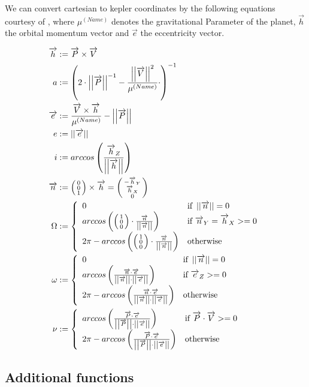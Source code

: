 \documentclass[11pt]{article}
\newcommand{\oa}[1]{\overrightarrow{#1}}
\newcommand{\Pos}{\oa{P}}
\newcommand{\Vel}{\oa{V}}
\newcommand{\absvec}[1]{\left|\left|{#1}\right|\right|}
\newcommand{\dddvec}[3]{\left(\begin{smallmatrix}{#1}\\{#2}\\{#3}\end{smallmatrix}\right)}
\begin{document}
We can convert cartesian to kepler coordinates by the following
equations courtesy of \cite{RSCK}, where $\mu^{(Name)}$ denotes the
gravitational Parameter of the planet, $\oa{h}$ the orbital momentum
vector and $\oa{e}$ the eccentricity vector.

\begin{align}
  \oa{h} &:= \Pos \times \Vel\nonumber\\
  a &:= \left(2\cdot\absvec{\Pos}^{-1} - \frac{\absvec{\Vel}^2}{\mu^{(Name)}}\cdot \right)^{-1}\\
  \oa{e} &:= \frac{\Vel\times \oa{h}}{\mu^{(Name)}} - \absvec{\Pos}\nonumber\\
  e &:= \absvec{\oa{e}}\\
  i &:= arccos\left(\frac{\oa{h}_Z}{\absvec{\oa{h}}} \right)\\
  \oa{n} & := \dddvec{0}{0}{1} \times \oa{h} = \dddvec{-\oa{h}_Y}{\oa{h}_X}{0}\nonumber\\
  \Omega &:= \left\{
    \begin{array}{l l}
      0 & \textrm{if } \absvec{\oa{n}} = 0\\
      arccos\left(\dddvec{1}{0}{0}\cdot\frac{\oa{n}}{\absvec{\oa{n}}} \right) & \textrm{if } \oa{n}_Y = \oa{h}_X >= 0\\
      2\pi - arccos\left(\dddvec{1}{0}{0}\cdot\frac{\oa{n}}{\absvec{\oa{n}}} \right) & \textrm{otherwise}
    \end{array}
    \right.\\
  \omega & := \left\{
    \begin{array}{l l}
      0 & \textrm{if } \absvec{\oa{n}} = 0\\
      arccos\left(\frac{\oa{n}\cdot\oa{e}}{\absvec{\oa{n}}\cdot\absvec{\oa{e}}} \right) & \textrm{if } \oa{e}_Z >= 0\\
      2\pi - arccos\left(\frac{\oa{n}\cdot\oa{e}}{\absvec{\oa{n}}\cdot\absvec{\oa{e}}}\right) & \textrm{otherwise}
    \end{array}
    \right.\\
    \nu &:= \left\{
    \begin{array}{l l}
      arccos\left(\frac{\Pos\cdot\oa{e}}{\absvec{\Pos}\cdot\absvec{\oa{e}}}\right) & \textrm{if } \Pos\cdot\Vel >= 0\\
      2\pi - arccos\left(\frac{\Pos\cdot\oa{e}}{\absvec{\Pos}\cdot\absvec{\oa{e}}}\right) & \textrm{otherwise}
    \end{array}
    \right.
\end{align}

\subsection{Additional functions}
\end{document}
